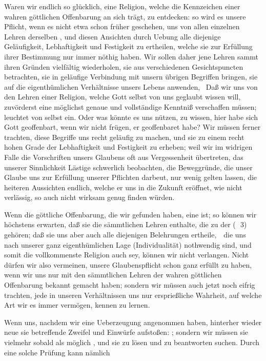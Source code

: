 \begin{aufza}
\item Waren wir endlich so glücklich, eine Religion, welche die Kennzeichen einer wahren göttlichen Offenbarung an sich trägt, zu entdecken: so wird es unsere Pflicht, wenn es nicht etwa schon früher geschehen, uns von allen einzelnen Lehren derselben , und diesen Ansichten durch Uebung alle diejenige Geläufigkeit, Lebhaftigkeit und Festigkeit zu ertheilen, welche sie zur Erfüllung ihrer Bestimmung nur immer nöthig haben. Wir sollen daher jene Lehren sammt ihren Gründen vielfältig wiederholen, sie aus verschiedenen Gesichtspuncten betrachten, sie in geläufige Verbindung mit unsern übrigen Begriffen bringen, sie auf die eigenthümlichen Verhältnisse unsers Lebens anwenden, \usw\ Daß wir uns von den Lehren einer Religion, welche Gott selbst von uns geglaubt wissen will, zuvörderst eine möglichst genaue und vollständige Kenntniß verschaffen müssen; leuchtet von selbst ein. Oder was könnte es uns nützen, zu wissen, hier habe sich Gott geoffenbart, wenn wir nicht frügen,  er geoffenbaret habe? Wir müssen ferner trachten, diese Begriffe uns recht geläufig zu machen, und sie zu einem recht hohen Grade der Lebhaftigkeit und Festigkeit zu erheben; weil wir im widrigen Falle die Vorschriften unsers Glaubens oft aus Vergessenheit übertreten, das unserer Sinnlichkeit Lästige schwerlich beobachten, die Beweggründe, die unser Glaube uns zur Erfüllung unserer Pflichten darbeut, nur wenig gelten lassen, die heiteren Aussichten endlich, welche er uns in die Zukunft eröffnet, wie nicht verlässig, so auch nicht wirksam genug finden würden.
\item Wenn die göttliche Offenbarung, die wir gefunden haben, eine  ist; so können wir höchstens erwarten, daß sie die sämmtlichen Lehren enthalte, die zu der  (\ \no\,3) gehören; daß sie uns aber auch alle diejenigen Belehrungen ertheile,~\ die uns nach unserer ganz eigenthümlichen Lage (Individualität) nothwendig sind, und somit die vollkommenste Religion auch  sey, können wir nicht verlangen. Nicht dürfen wir also vermeinen, unsere Glaubenspflicht schon ganz erfüllt zu haben, wenn wir uns nur mit den sämmtlichen Lehren der wahren göttlichen Offenbarung bekannt gemacht haben; sondern wir müssen auch jetzt noch eifrig trachten, jede in unseren Verhältnissen uns nur ersprießliche Wahrheit, auf welche Art wir es immer vermögen, kennen zu lernen.
\item Wenn uns, nachdem wir eine Ueberzeugung angenommen haben, hinterher wieder neue sie betreffende Zweifel und Einwürfe aufstoßen: ; sondern wir müssen sie vielmehr sobald als möglich , und sie zu lösen und zu beantworten suchen. Durch eine solche Prüfung kann nämlich

\end{aufza}
